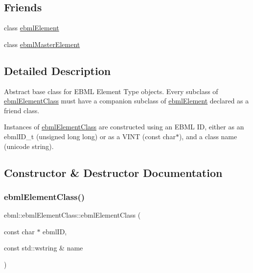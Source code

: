\subsection*{Friends}
\begin{DoxyCompactItemize}
\item 
class \mbox{\hyperlink{classebml_1_1ebmlElementClass_ab57be41c560fe3aac8d5eb6b138c09a5}{ebml\+Element}}
\item 
class \mbox{\hyperlink{classebml_1_1ebmlElementClass_ad88e86cba72e9332a4693c1c6009b281}{ebml\+Master\+Element}}
\end{DoxyCompactItemize}


\subsection{Detailed Description}
Abstract base class for E\+B\+ML Element Type objects. Every subclass of \mbox{\hyperlink{classebml_1_1ebmlElementClass}{ebml\+Element\+Class}} must have a companion subclass of \mbox{\hyperlink{classebml_1_1ebmlElement}{ebml\+Element}} declared as a friend class.

Instances of \mbox{\hyperlink{classebml_1_1ebmlElementClass}{ebml\+Element\+Class}} are constructed using an E\+B\+ML ID, either as an ebml\+I\+D\+\_\+t (unsigned long long) or as a V\+I\+NT (const char$\ast$), and a class name (unicode string). 

\subsection{Constructor \& Destructor Documentation}
\mbox{\label{classebml_1_1ebmlElementClass_a6c2081870c5d66c70e0cf988ff253420}} 
\subsubsection{\texorpdfstring{ebml\+Element\+Class()}{ebmlElementClass()}\hspace{0.1cm}{\footnotesize\ttfamily [1/2]}}
{\footnotesize\ttfamily ebml\+::ebml\+Element\+Class\+::ebml\+Element\+Class (\begin{DoxyParamCaption}\item[{const char $\ast$}]{ebml\+ID,  }\item[{const std\+::wstring \&}]{name }\end{DoxyParamCaption})}

